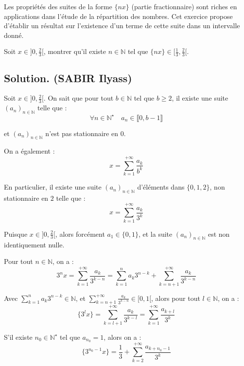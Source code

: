 Les propri{\'e}t{\'e}s des suites de la forme $\{nx\}$ (partie fractionnaire)
sont riches en applications dans l'{\'e}tude de la r{\'e}partition des
nombres. Cet exercice propose d'{\'e}tablir un r{\'e}sultat sur l'existence
d'un terme de cette suite dans un intervalle donn{\'e}.

\begin{exercise}[]
Soit $x \in] 0, \frac{2}{3} [$, montrer qu'il existe $n \in \mathbb{N}$ tel
que $\{nx\} \in [\frac{1}{3}, \frac{2}{3} [$.

\end{exercise}

\subsection*{Solution. (SABIR Ilyass)}

Soit $x \in] 0, \frac{2}{3} [$. On sait que pour tout $b \in \mathbb{N}$ tel
que $b \geq 2$, il existe une suite $(a_n)_{n \in \mathbb{N}}$ telle que :
\[ \forall n \in \mathbb{N}^{\star}  \quad a_n \in \llbracket 0, b - 1
   \rrbracket \]


et $(a_n)_{n \in \mathbb{N}}$ n'est pas stationnaire en $0$.

On a {\'e}galement :
\[ x = \sum_{k = 1}^{+ \infty} \frac{a_k}{b^k} \]


En particulier, il existe une suite $(a_n)_{n \in \mathbb{N}}$
d'{\'e}l{\'e}ments dans $\{0, 1, 2\}$, non stationnaire en $2$ telle que :
\[ x = \sum_{k = 1}^{+ \infty} \frac{a_k}{3^k} \]


Puisque $x \in] 0, \frac{2}{3} [$, alors forc{\'e}ment $a_1 \in \{0, 1\}$, et
la suite $(a_n)_{n \in \mathbb{N}}$ est non identiquement nulle.

Pour tout $n \in \mathbb{N}$, on a :
\[ 3^n x = \sum_{k = 1}^{+ \infty} \frac{a_k}{3^{k - n}} = \sum_{k = 1}^n a_k
   3^{n - k} + \sum_{k = n + 1}^{+ \infty} \frac{a_k}{3^{k - n}} \]


Avec $\sum_{k = 1}^n a_k 3^{n - k} \in \mathbb{N}$, et $\sum_{k = n + 1}^{+
\infty} \frac{a_k}{3^{k - n}} \in [0, 1 [$, alors pour tout $l \in
\mathbb{N}$, on a :
\[ \{3^l x\}= \sum_{k = l + 1}^{+ \infty} \frac{a_k}{3^{k - l}} = \sum_{k =
   1}^{+ \infty} \frac{a_{k + l}}{3^k} \]


S'il existe $n_0 \in \mathbb{N}^{\star}$ tel que $a_{n_0} = 1$, alors on a :
\[ \{3^{n_0 - 1} x\}= \frac{1}{3} + \sum_{k = 2}^{+ \infty} \frac{a_{k + n_0 -
   1}}{3^k} \]


